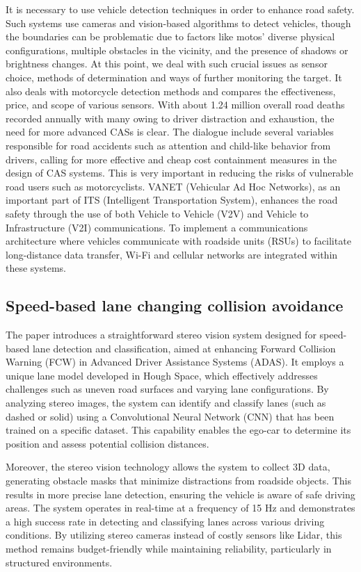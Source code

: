 \documentclass[12pt,twocolumn]{article}
\begin{document}
It is necessary to use vehicle detection techniques in order to enhance road safety. Such systems use cameras and vision-based algorithms to detect vehicles, though the boundaries can be problematic due to factors like motos’ diverse physical configurations, multiple obstacles in the vicinity, and the presence of shadows or brightness changes.
At this point, we deal with such crucial issues as sensor choice, methods of determination and ways of further monitoring the target. It also deals with motorcycle detection methods and compares the effectiveness, price, and scope of various sensors.
With about 1.24 million overall road deaths recorded annually with many owing to driver distraction and exhaustion, the need for more advanced CASs is clear. The dialogue include several variables responsible for road accidents such as attention and child-like behavior from drivers, calling for more effective and cheap cost containment measures in the design of CAS systems. This is very important in reducing the risks of vulnerable road users such as motorcyclists.
VANET (Vehicular Ad Hoc Networks), as an important part of ITS (Intelligent Transportation System), enhances the road safety through the use of both Vehicle to Vehicle (V2V) and Vehicle to Infrastructure (V2I) communications. To implement a communications architecture where vehicles communicate with roadside units (RSUs) to facilitate long-distance data transfer, Wi-Fi and cellular networks are integrated within these systems.
\subsection{Speed-based lane changing collision avoidance}
The paper introduces a straightforward stereo vision system designed for speed-based lane detection and classification, aimed at enhancing Forward Collision Warning (FCW) in Advanced Driver Assistance Systems (ADAS). It employs a unique lane model developed in Hough Space, which effectively addresses challenges such as uneven road surfaces and varying lane configurations. By analyzing stereo images, the system can identify and classify lanes (such as dashed or solid) using a Convolutional Neural Network (CNN) that has been trained on a specific dataset. This capability enables the ego-car to determine its position and assess potential collision distances.

Moreover, the stereo vision technology allows the system to collect 3D data, generating obstacle masks that minimize distractions from roadside objects. This results in more precise lane detection, ensuring the vehicle is aware of safe driving areas. The system operates in real-time at a frequency of 15 Hz and demonstrates a high success rate in detecting and classifying lanes across various driving conditions. By utilizing stereo cameras instead of costly sensors like Lidar, this method remains budget-friendly while maintaining reliability, particularly in structured environments.
\end{document}
